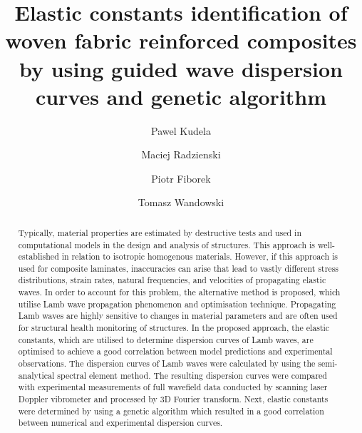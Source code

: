 \documentclass[preprint,12pt]{elsarticle}
\begin{document}
	\begin{frontmatter}
		
		\title{Elastic constants identification of woven fabric reinforced composites by using guided wave dispersion curves and genetic algorithm}
		
		\address[IFFM]{Institute of Fluid Flow Machinery, Polish Academy of Sciences, Poland}
		
		\author{Pawel Kudela}
		\author{Maciej Radzienski}
		\author{Piotr Fiborek }
		\author{Tomasz Wandowski }	
		
		
		\begin{abstract}
		Typically, material properties are estimated by destructive tests and used in computational models in the design and analysis of structures. This approach is well-established in relation to isotropic homogenous materials. However, if this approach is used for composite laminates, inaccuracies can arise that lead to vastly different stress distributions, strain rates, natural frequencies, and velocities of propagating elastic waves. In order to account for this problem, the alternative method is proposed, which utilise Lamb wave propagation phenomenon and optimisation technique. Propagating Lamb waves are highly sensitive to changes in material parameters and are often used for structural health monitoring of structures. In the proposed approach, the elastic constants, which are utilised to determine dispersion curves of Lamb waves, are optimised to achieve a good correlation between model predictions and experimental observations. The dispersion curves of Lamb waves were calculated by using the semi-analytical spectral element method. The resulting dispersion curves were compared with experimental measurements of full wavefield data conducted by scanning laser Doppler vibrometer and processed by 3D Fourier transform. Next, elastic constants were determined by using a genetic algorithm which resulted in a good correlation between numerical and experimental dispersion curves.
		\end{abstract}
		

\end{frontmatter}
\end{document}
